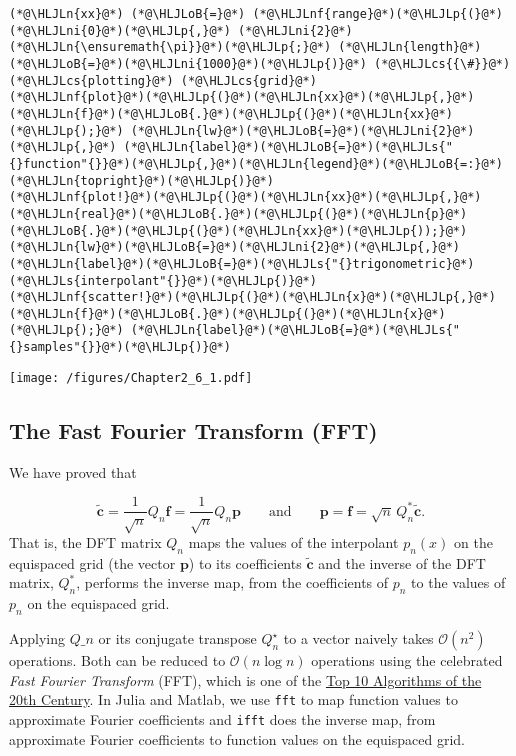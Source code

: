 \documentclass[12pt,landscape]{article}
\newcommand{\HLJLn}[1]{#1}
\newcommand{\HLJLnf}[1]{\textcolor[RGB]{66,102,213}{#1}}
\newcommand{\HLJLs}[1]{\textcolor[RGB]{201,61,57}{#1}}
\newcommand{\HLJLni}[1]{\textcolor[RGB]{59,151,46}{#1}}
\newcommand{\HLJLoB}[1]{\textcolor[RGB]{102,102,102}{\textbf{#1}}}
\newcommand{\HLJLp}[1]{#1}
\newcommand{\HLJLcs}[1]{\textcolor[RGB]{153,153,119}{\textit{#1}}}
\begin{document}
{\begin{lstlisting}
(*@\HLJLn{xx}@*) (*@\HLJLoB{=}@*) (*@\HLJLnf{range}@*)(*@\HLJLp{(}@*)(*@\HLJLni{0}@*)(*@\HLJLp{,}@*) (*@\HLJLni{2}@*)(*@\HLJLn{\ensuremath{\pi}}@*)(*@\HLJLp{;}@*) (*@\HLJLn{length}@*)(*@\HLJLoB{=}@*)(*@\HLJLni{1000}@*)(*@\HLJLp{)}@*) (*@\HLJLcs{{\#}}@*) (*@\HLJLcs{plotting}@*) (*@\HLJLcs{grid}@*)
(*@\HLJLnf{plot}@*)(*@\HLJLp{(}@*)(*@\HLJLn{xx}@*)(*@\HLJLp{,}@*) (*@\HLJLn{f}@*)(*@\HLJLoB{.}@*)(*@\HLJLp{(}@*)(*@\HLJLn{xx}@*)(*@\HLJLp{);}@*) (*@\HLJLn{lw}@*)(*@\HLJLoB{=}@*)(*@\HLJLni{2}@*)(*@\HLJLp{,}@*) (*@\HLJLn{label}@*)(*@\HLJLoB{=}@*)(*@\HLJLs{"{}function"{}}@*)(*@\HLJLp{,}@*)(*@\HLJLn{legend}@*)(*@\HLJLoB{=:}@*)(*@\HLJLn{topright}@*)(*@\HLJLp{)}@*)
(*@\HLJLnf{plot!}@*)(*@\HLJLp{(}@*)(*@\HLJLn{xx}@*)(*@\HLJLp{,}@*) (*@\HLJLn{real}@*)(*@\HLJLoB{.}@*)(*@\HLJLp{(}@*)(*@\HLJLn{p}@*)(*@\HLJLoB{.}@*)(*@\HLJLp{(}@*)(*@\HLJLn{xx}@*)(*@\HLJLp{));}@*) (*@\HLJLn{lw}@*)(*@\HLJLoB{=}@*)(*@\HLJLni{2}@*)(*@\HLJLp{,}@*) (*@\HLJLn{label}@*)(*@\HLJLoB{=}@*)(*@\HLJLs{"{}trigonometric}@*) (*@\HLJLs{interpolant"{}}@*)(*@\HLJLp{)}@*)
(*@\HLJLnf{scatter!}@*)(*@\HLJLp{(}@*)(*@\HLJLn{x}@*)(*@\HLJLp{,}@*) (*@\HLJLn{f}@*)(*@\HLJLoB{.}@*)(*@\HLJLp{(}@*)(*@\HLJLn{x}@*)(*@\HLJLp{);}@*) (*@\HLJLn{label}@*)(*@\HLJLoB{=}@*)(*@\HLJLs{"{}samples"{}}@*)(*@\HLJLp{)}@*)
\end{lstlisting}

\texttt{[image: /figures/Chapter2\_6\_1.pdf]}

\subsection{The Fast Fourier Transform (FFT)}
We have proved that

\[
\tilde{\mathbf{c}} =  \frac{1}{\sqrt{n}}Q_{n}\mathbf{f} =  \frac{1}{\sqrt{n}}Q_{n}\mathbf{p} \qquad \text{and} \qquad \mathbf{p} = \mathbf{f} = \sqrt{n}\,Q_{n}^*\tilde{\mathbf{c}}.
\]
That is, the DFT matrix $Q_n$ maps the values of the interpolant $p_n(x)$ on the equispaced grid (the vector $\mathbf{p}$) to its coefficients $\tilde{\mathbf{c}}$ and the inverse of the DFT matrix, $Q_{n}^*$, performs the inverse map, from the coefficients of $p_n$ to the values of $p_n$ on the equispaced grid.

Applying $Q\ensuremath{\_n}$ or its conjugate transpose $Q_n^\ensuremath{\star}$ to a vector naively takes $\mathcal{O}(n^2)$ operations. Both can be reduced to $\mathcal{O}(n \log n)$ operations using the celebrated \emph{Fast Fourier Transform} (FFT), which is one of the \href{https://pi.math.cornell.edu/~web6140/}{Top 10 Algorithms of the 20th Century}.  In Julia and Matlab, we use \texttt{fft} to map function values to approximate Fourier coefficients and \texttt{ifft} does the inverse map, from approximate Fourier coefficients to function values on the equispaced grid.


}
\end{document}
